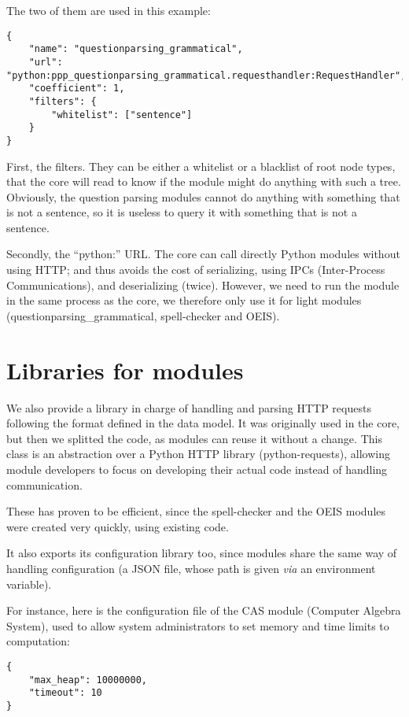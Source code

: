 The two of them are used in this example:

\begin{verbatim}
{
    "name": "questionparsing_grammatical",
    "url": "python:ppp_questionparsing_grammatical.requesthandler:RequestHandler",
    "coefficient": 1,
    "filters": {
        "whitelist": ["sentence"]
    }
}
\end{verbatim}

First, the filters. They can be
either a whitelist or a blacklist of root node types, that the core will
read to know if the module might do anything with such a tree.
Obviously, the question parsing modules cannot do anything with something
that is not a sentence, so it is useless to query it with something that
is not a sentence.

Secondly, the “python:” URL. The core can call directly Python modules
without using HTTP; and thus avoids the cost of serializing, using IPCs
(Inter-Process Communications), and deserializing (twice).
However, we need to run the module in the same process as the core, we therefore
only use it for light modules (questionparsing\_grammatical, spell-checker and OEIS).

\section{Libraries for modules}

We also provide a library in charge of handling and parsing HTTP
requests following the format defined in the data model. It was originally
used in the core, but then we splitted the code, as modules can reuse
it without a change.
This class is an abstraction over a Python HTTP library (python-requests),
allowing module developers to focus on developing their actual code
instead of handling communication.

These has proven to be efficient, since the spell-checker and the OEIS modules
were created very quickly, using existing code.

It also exports its configuration library too, since modules share the
same way of handling configuration (a JSON file, whose path
is given {\em via} an environment variable).

For instance, here is the configuration file of the CAS module (Computer Algebra
System), used to allow system administrators to set memory and time limits
to computation:

\begin{verbatim}
{
    "max_heap": 10000000,
    "timeout": 10
}
\end{verbatim}
